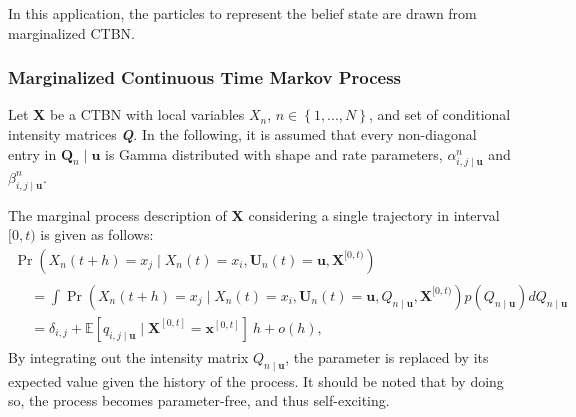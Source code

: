 In this application, the particles to represent the belief state are drawn from marginalized CTBN.
\subsubsection{Marginalized Continuous Time Markov Process}
Let \textbf{X} be a CTBN with local variables $ X_n $, $ n\in \left\lbrace 1,...,N \right\rbrace $, and set of conditional intensity matrices \textbf{\textit{Q}}. In the following, it is assumed that every non-diagonal entry in $ \textbf{Q}_{n}\mid \textbf{u} $ is Gamma distributed with shape and rate parameters, $ \alpha^n_{i,j\mid \textbf{u}} $ and $ \beta^n_{i,j\mid \textbf{u}} $.

The marginal process description of \textbf{X} considering a single trajectory in interval $ [0,t) $ is given as follows:
\begin{multline}
\operatorname{Pr}(X_n(t + h) = x_j \mid X_n(t)=x_i, \textbf{U}_n(t)=\textbf{u}, \textbf{X}^{[0, t)})\\
\begin{split}
&= \int \operatorname{Pr}(X_n(t + h) = x_j \mid X_n(t)=x_i, \textbf{U}_n(t)=\textbf{u}, Q_{n\mid \textbf{u}}, \textbf{X}^{[0, t)})p(Q_{n\mid \textbf{u}})dQ_{n\mid \textbf{u}}\\
&= \delta_{i,j} + \mathbb{E}[q_{i,j\mid \textbf{u}} \mid \textbf{X}^{[0, t]} = \textbf{x}^{[0, t]}]\ h + o(h),
\end{split}
\label{eq:marginal_CTBN}
\end{multline}
By integrating out the intensity matrix $ Q_{n\mid \textbf{u}} $, the parameter is replaced by its expected value given the history of the process. It should be noted that by doing so, the process becomes parameter-free, and thus self-exciting. 

